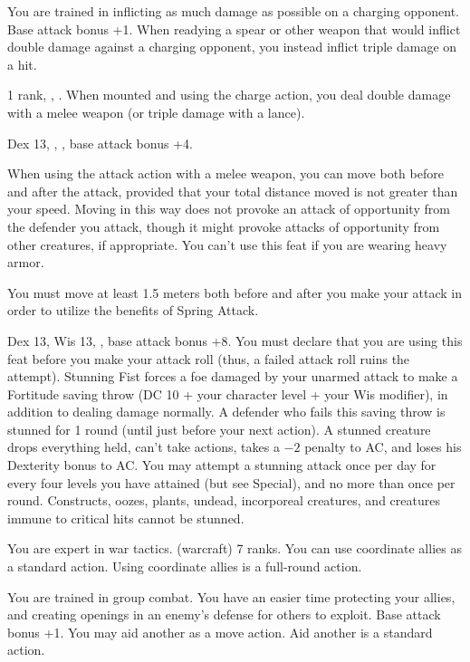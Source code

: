 {You are trained in inflicting as much damage as possible on a charging opponent.}
{Base attack bonus +1.}
{When readying a spear or other weapon that would inflict double damage against a charging opponent, you instead inflict triple damage on a hit.}{}{}

{ 1 rank, , .}
{When mounted and using the charge action, you deal double damage with a melee weapon (or triple damage with a lance).}

{Dex 13, , , base attack bonus +4.}
{When using the attack action with a melee weapon, you can move both before and after the attack, provided that your total distance moved is not greater than your speed. Moving in this way does not provoke an attack of opportunity from the defender you attack, though it might provoke attacks of opportunity from other creatures, if appropriate. You can't use this feat if you are wearing heavy armor.

You must move at least 1.5 meters both before and after you make your attack in order to utilize the benefits of Spring Attack.}

{Dex 13, Wis 13, , base attack bonus +8.}
{You must declare that you are using this feat before you make your attack roll (thus, a failed attack roll ruins the attempt). Stunning Fist forces a foe damaged by your unarmed attack to make a Fortitude saving throw (DC 10 + \onehalf your character level + your Wis modifier), in addition to dealing damage normally. A defender who fails this saving throw is stunned for 1 round (until just before your next action). A stunned creature drops everything held, can't take actions, takes a $-2$ penalty to AC, and loses his Dexterity bonus to AC. You may attempt a stunning attack once per day for every four levels you have attained (but see Special), and no more than once per round. Constructs, oozes, plants, undead, incorporeal creatures, and creatures immune to critical hits cannot be stunned.}

{You are expert in war tactics.}
{ (warcraft) 7 ranks.}
{You can use coordinate allies as a standard action.}
{Using coordinate allies is a full-round action.}{}

{You are trained in group combat. You have an easier time protecting your allies, and creating openings in an enemy's defense for others to exploit.}
{Base attack bonus +1.}
{You may aid another as a move action.}
{Aid another is a standard action.}{}

